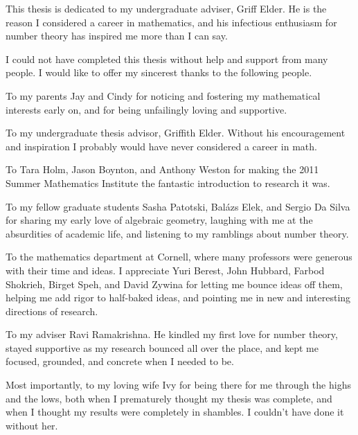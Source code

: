 \documentclass[phd,cornellheadings,tocprelim]{cornell}
\begin{document}
\begin{dedication}
This thesis is dedicated to my undergraduate adviser, Griff Elder. He is the 
reason I considered a career in mathematics, and his infectious enthusiasm 
for number theory has inspired me more than I can say. 
\end{dedication}

\begin{acknowledgements}
I could not have completed this thesis without help and support from many 
people. I would like to offer my sincerest thanks to the following people. 

To my parents Jay and Cindy for noticing and fostering my mathematical 
interests early on, and for being unfailingly loving and supportive. 

To my undergraduate thesis advisor, Griffith Elder. Without his encouragement 
and inspiration I probably would have never considered a career in math. 

To Tara Holm, Jason Boynton, and Anthony Weston for making the 2011 Summer 
Mathematics Institute the fantastic introduction to research it was. 

To my fellow graduate students Sasha Patotski, Bal\'azs Elek, and Sergio Da 
Silva for sharing my early love of algebraic geometry, laughing with me at the 
absurdities of academic life, and listening to my ramblings about number theory. 

To the mathematics department at Cornell, where many professors were generous 
with their time and ideas. I appreciate Yuri Berest, John Hubbard, Farbod 
Shokrieh, Birget Speh, and David Zywina for letting me bounce ideas off them, 
helping me add rigor to half-baked ideas, and pointing me in new and 
interesting directions of research. 

To my adviser Ravi Ramakrishna. He kindled my first love for number theory, 
stayed supportive as my research bounced all over the place, and kept me 
focused, grounded, and concrete when I needed to be. 

Most importantly, to my loving wife Ivy for being there for me through the highs 
and the lows, both when I prematurely thought my thesis was complete, and when I 
thought my results were completely in shambles. I couldn't have done it without 
her. 
\end{acknowledgements}

\contentspage
\normalspacing
\setcounter{page}{1}
\pagestyle{cornell}
\addtolength{\parskip}{0.5\baselineskip}









%







\printbibliography[heading=bibintoc]
\end{document}
